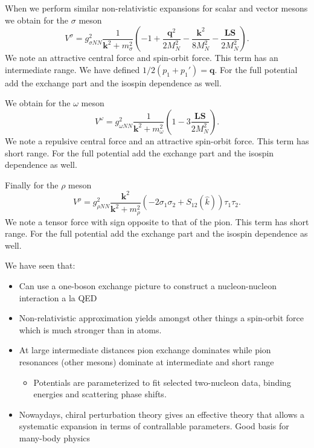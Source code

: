 \documentclass[%
oneside,                 %
final,                   %
10pt]{article}
\begin{document}
When we perform similar non-relativistic expansions for scalar and vector mesons we obtain
for the $\sigma$ meson
\[
V^{\sigma}= g_{\sigma NN}^{2}\frac{1}{\mathbf{k}^{2}+m_{\sigma}^{2}}\left (-1+\frac{\mathbf{q}^{2}}{2M_N^2}
-\frac{\mathbf{k}^{2}}{8M_N^2}-\frac{\mathbf{LS}}{2M_N^2}\right).
\]
We note an attractive central force and spin-orbit force. This term has an intermediate range.
We have defined $1/2(p_{1}+p_{1}')=\mathbf{q}$.
For the full potential add the exchange part and the isospin dependence as well.

We obtain
for the $\omega$ meson
\[
V^{\omega}= g_{\omega NN}^{2}\frac{1}{\mathbf{k}^{2}+m_{\omega}^{2}}\left (1-3\frac{\mathbf{LS}}{2M_N^2}\right).
\]
We note a repulsive central force and an attractive spin-orbit force. This term has  short range.
For the full potential add the exchange part and the isospin dependence as well.

Finally 
for the $\rho$ meson
\[
V^{\rho}= g_{\rho NN}^{2}\frac{\mathbf{k}^{2}}{\mathbf{k}^{2}+m_{\rho}^{2}}\left (
-2\sigma_{1}\sigma_{2}+S_{12}(\hat{k})\right)\tau_{1}\tau_{2}.
\]
We note a tensor force with sign opposite to that of the pion. This term has  short range. For the full potential add the exchange part and the isospin dependence as well.

We have seen that:
\begin{itemize}
\item Can use a one-boson exchange picture to construct a nucleon-nucleon interaction a la QED

\item Non-relativistic approximation yields amongst other things a spin-orbit force which is much stronger than in atoms.

\item At large intermediate distances pion exchange dominates while  pion resonances (other mesons) dominate at intermediate and short range 
\begin{itemize}

 \item Potentials are parameterized to fit selected two-nucleon data, binding energies and scattering phase shifts.

\end{itemize}

\noindent
\item Nowaydays, chiral perturbation theory gives an effective theory that allows a systematic expansion in terms of contrallable parameters. Good basis for many-body physics
\end{itemize}
\end{document}

